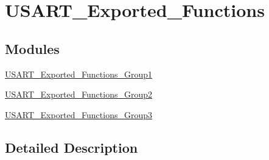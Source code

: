 \hypertarget{group___u_s_a_r_t___exported___functions}{}\section{U\+S\+A\+R\+T\+\_\+\+Exported\+\_\+\+Functions}
\label{group___u_s_a_r_t___exported___functions}
\subsection*{Modules}
\begin{DoxyCompactItemize}
\item 
\hyperlink{group___u_s_a_r_t___exported___functions___group1}{U\+S\+A\+R\+T\+\_\+\+Exported\+\_\+\+Functions\+\_\+\+Group1}
\item 
\hyperlink{group___u_s_a_r_t___exported___functions___group2}{U\+S\+A\+R\+T\+\_\+\+Exported\+\_\+\+Functions\+\_\+\+Group2}
\item 
\hyperlink{group___u_s_a_r_t___exported___functions___group3}{U\+S\+A\+R\+T\+\_\+\+Exported\+\_\+\+Functions\+\_\+\+Group3}
\end{DoxyCompactItemize}


\subsection{Detailed Description}
